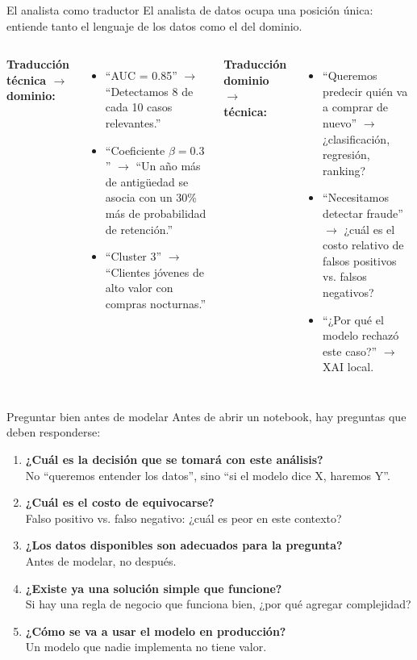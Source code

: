 \documentclass[aspectratio=169]{beamer}
\begin{document}
\begin{frame}{El analista como traductor}
  El analista de datos ocupa una posición única: entiende tanto el lenguaje de los datos como el del dominio.

  \bigskip
  \begin{columns}
      \textbf{Traducción técnica $\rightarrow$ dominio:}
      \begin{itemize}
        \item ``AUC = 0.85'' $\rightarrow$ ``Detectamos 8 de cada 10 casos relevantes.''
        \item ``Coeficiente $\beta = 0.3$'' $\rightarrow$ ``Un año más de antigüedad se asocia con un 30\% más de probabilidad de retención.''
        \item ``Cluster 3'' $\rightarrow$ ``Clientes jóvenes de alto valor con compras nocturnas.''
      \end{itemize}
      \textbf{Traducción dominio $\rightarrow$ técnica:}
      \begin{itemize}
        \item ``Queremos predecir quién va a comprar de nuevo'' $\rightarrow$ ¿clasificación, regresión, ranking?
        \item ``Necesitamos detectar fraude'' $\rightarrow$ ¿cuál es el costo relativo de falsos positivos vs. falsos negativos?
        \item ``¿Por qué el modelo rechazó este caso?'' $\rightarrow$ XAI local.
      \end{itemize}
  \end{columns}
\end{frame}

\begin{frame}{Preguntar bien antes de modelar}
  Antes de abrir un notebook, hay preguntas que deben responderse:

  \bigskip
  \begin{enumerate}
    \item \textbf{¿Cuál es la decisión que se tomará con este análisis?} \\
    No ``queremos entender los datos'', sino ``si el modelo dice X, haremos Y''.
    \item \textbf{¿Cuál es el costo de equivocarse?} \\
    Falso positivo vs. falso negativo: ¿cuál es peor en este contexto?
    \item \textbf{¿Los datos disponibles son adecuados para la pregunta?} \\
    Antes de modelar, no después.
    \item \textbf{¿Existe ya una solución simple que funcione?} \\
    Si hay una regla de negocio que funciona bien, ¿por qué agregar complejidad?
    \item \textbf{¿Cómo se va a usar el modelo en producción?} \\
    Un modelo que nadie implementa no tiene valor.
  \end{enumerate}
\end{frame}
\end{document}
